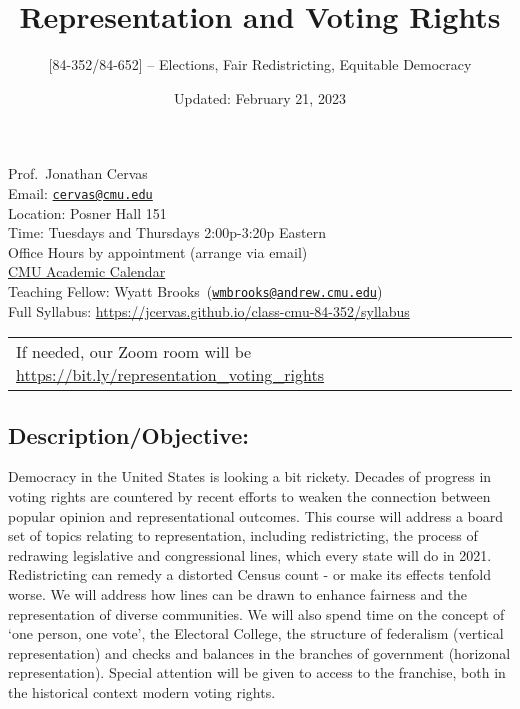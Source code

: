 \documentclass[
]{article}
\title{Representation and Voting Rights}
\subtitle{{[}84-352/84-652{]} -- Elections, Fair Redistricting,
Equitable Democracy}
\author{}
\date{\vspace{-2.5em}Updated: February 21, 2023}
\begin{document}
\maketitle

Prof.~Jonathan Cervas\\
Email: \href{mailto:cervas@cmu.edu}{\nolinkurl{cervas@cmu.edu}}\\
Location: Posner Hall 151\\
Time: Tuesdays and Thursdays 2:00p-3:20p Eastern\\
Office Hours by appointment (arrange via email)\\
\href{https://www.cmu.edu/hub/calendar/}{CMU Academic Calendar}\\
Teaching Fellow: Wyatt
Brooks~(\href{mailto:wmbrooks@andrew.cmu.edu}{\nolinkurl{wmbrooks@andrew.cmu.edu}})\\

Full Syllabus: \url{https://jcervas.github.io/class-cmu-84-352/syllabus}

\begin{longtable}[]{@{}
  >{\raggedright\arraybackslash}p{}@{}}
\toprule\noalign{}
\endhead
\bottomrule\noalign{}
\endlastfoot
If needed, our Zoom room will be
\url{https://bit.ly/representation_voting_rights} \\
\end{longtable}

\hypertarget{descriptionobjective}{%
\subsection{Description/Objective:}\label{descriptionobjective}}

Democracy in the United States is looking a bit rickety. Decades of
progress in voting rights are countered by recent efforts to weaken the
connection between popular opinion and representational outcomes. This
course will address a board set of topics relating to representation,
including redistricting, the process of redrawing legislative and
congressional lines, which every state will do in 2021. Redistricting
can remedy a distorted Census count - or make its effects tenfold worse.
We will address how lines can be drawn to enhance fairness and the
representation of diverse communities. We will also spend time on the
concept of `one person, one vote', the Electoral College, the structure
of federalism (vertical representation) and checks and balances in the
branches of government (horizonal representation). Special attention
will be given to access to the franchise, both in the historical context
modern voting rights.
\end{document}

